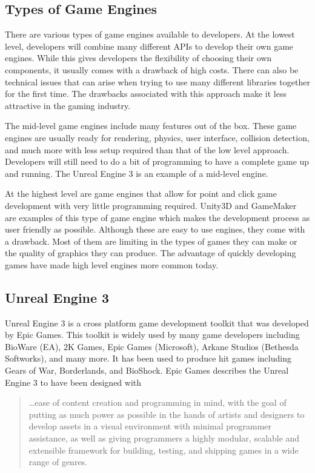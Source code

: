 \subsection{Types of Game Engines}
There are various types of game engines available to developers. At the lowest level, developers will combine many different APIs to develop their own game engines. While this gives developers the flexibility of choosing their own components, it usually comes with a drawback of high costs. There can also be technical issues that can arise when trying to use many different libraries together for the first time. The drawbacks associated with this approach make it less attractive in the gaming industry.

The mid-level game engines include many features out of the box. These game engines are usually ready for rendering, physics, user interface, collision detection, and much more with less setup required than that of the low level approach. Developers will still need to do a bit of programming to have a complete game up and running. The Unreal Engine 3 is an example of a mid-level engine.

At the highest level are game engines that allow for point and click game development with very little programming required. Unity3D and GameMaker are examples of this type of game engine which makes the development process as user friendly as possible. Although these are easy to use engines, they come with a drawback. Most of them are limiting in the types of games they can make or the quality of graphics they can produce. The advantage of quickly developing games have made high level engines more common today.
 
\subsection{Unreal Engine 3}
Unreal Engine 3 is a cross platform game development toolkit that was developed by Epic Games. This toolkit is widely used by many game developers including BioWare (EA), 2K Games, Epic Games (Microsoft), Arkane Studios (Bethesda Softworks), and many more. It has been used to produce hit games including Gears of War, Borderlands, and BioShock. Epic Games describes the Unreal Engine 3 to have been designed with

\begin{quote}
\ldots ease of content creation and programming in mind, with the goal of putting as much power as possible in the hands of artists and designers to develop assets in a visual environment with minimal programmer assistance, as well as giving programmers a highly modular, scalable and extensible framework for building, testing, and shipping games in a wide range of genres. \cite{unreal_engine_3}
\end{quote}

